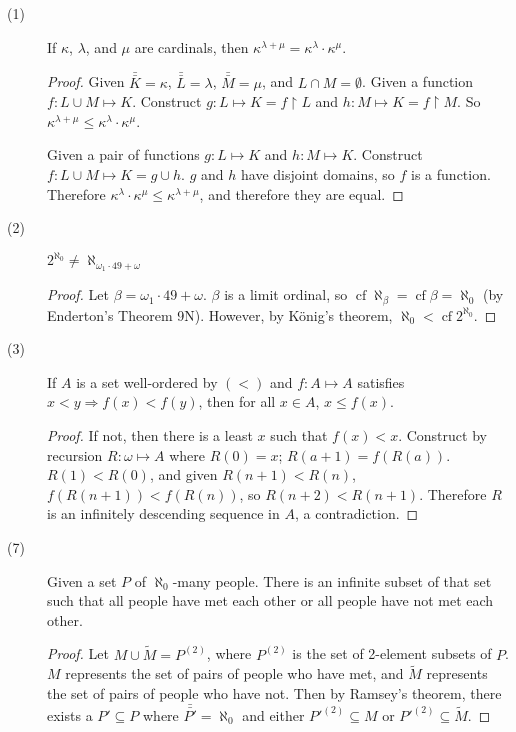 \documentclass[12pt]{article}
\DeclareMathOperator{\cf}{cf}
\newcommand{\card}[1]{\bar{\bar{#1}}}
\begin{document}
\begin{description}
\item[(1)]
  If $\kappa$, $\lambda$, and $\mu$ are cardinals, then $\kappa^{\lambda
  + \mu} = \kappa^\lambda \cdot \kappa^\mu$.
  \begin{proof}
	Given $\card{K} = \kappa$, $\card{L} = \lambda$, $\card{M} = \mu$,
	and $L \cap M = \emptyset$.  Given a function $f: L \cup M \mapsto
	K$.  Construct $g: L \mapsto K = f \upharpoonright L$ and $h: M
	\mapsto K = f \upharpoonright M$.  So $\kappa^{\lambda + \mu} \le
	\kappa^\lambda \cdot \kappa^\mu$.

	Given a pair of functions $g: L \mapsto K$ and $h: M \mapsto K$.
	Construct $f: L \cup M \mapsto K = g \cup h$.  $g$ and $h$ have
	disjoint domains, so $f$ is a function.  Therefore $\kappa^\lambda
	\cdot \kappa^\mu \le \kappa^{\lambda + \mu}$, and therefore they are
	equal.
  \end{proof}

\item[(2)]
  $2^{\aleph_0} \neq \aleph_{\omega_1 \cdot 49 + \omega}$
  \begin{proof} 
    Let $\beta = \omega_1 \cdot 49 + \omega$.  $\beta$ is a limit ordinal, 
	so $\cf{\aleph_\beta} = \cf{\beta} = \aleph_0$ (by Enderton's
	Theorem 9N).  However, by K\"onig's theorem, $\aleph_0 <
	\cf{2^{\aleph_0}}$.
  \end{proof}

\item[(3)]
  If $A$ is a set well-ordered by $(<)$ and $f:A \mapsto A$ satisfies $x
  < y \Rightarrow f(x) < f(y)$, then for all $x \in A$, $x \le f(x)$.
  \begin{proof}
	If not, then there is a least $x$ such that $f(x) < x$.  Construct
	by recursion $R:\omega \mapsto A$ where $R(0) = x$; $R(a+1) =
	f(R(a))$.  $R(1) < R(0)$, and given $R(n+1) < R(n)$, $f(R(n+1)) <
	f(R(n))$, so $R(n+2) < R(n+1)$.  Therefore $R$ is an infinitely
	descending sequence in $A$, a contradiction.
  \end{proof}

\item[(7)]
  Given a set $P$ of $\aleph_0$-many people.  There is an infinite
  subset of that set such that all people have met each other or all
  people have not met each other.
  \begin{proof}
	Let $M \cup \tilde{M} = P^{(2)}$, where $P^{(2)}$ is the set of
	2-element subsets of $P$.  $M$ represents the set of pairs of people
	who have met, and $\tilde{M}$ represents the set of pairs of people
	who have not.  Then by Ramsey's theorem, there exists a $P'
	\subseteq P$ where $\card{P'} = \aleph_0$ and either $P'^{(2)}
	\subseteq M$ or $P'^{(2)} \subseteq \tilde{M}$.
  \end{proof}

\end{description}
\end{document}
